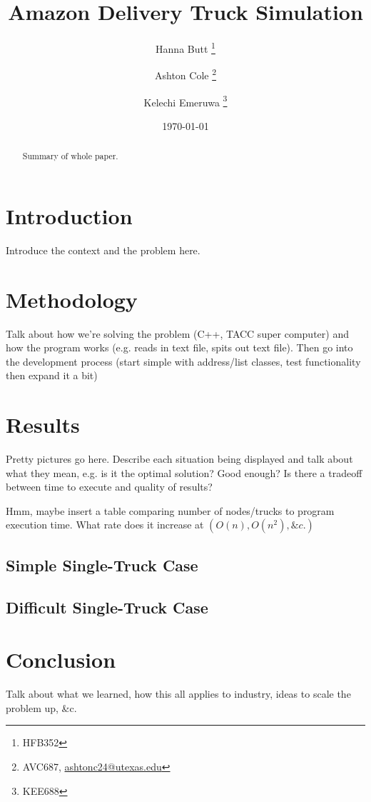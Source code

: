 \documentclass[letterpaper]{article}
\title{Amazon Delivery Truck Simulation}
\author{Hanna Butt \thanks{HFB352} \and Ashton Cole \thanks{AVC687, \href{mailto:ashtonc24@utexas.edu}{ashtonc24@utexas.edu}} \and Kelechi Emeruwa \thanks{KEE688}}
\date{\today}
\begin{document}
    \maketitle

    \begin{abstract}
        Summary of whole paper.
    \end{abstract}

    \section{Introduction}
    Introduce the context and the problem here.

    \section{Methodology}
    Talk about how we're solving the problem (C++, TACC super computer) and how the program works (e.g. reads in text file, spits out text file). Then go into the development process (start simple with address/list classes, test functionality then expand it a bit)

    \section{Results}
    Pretty pictures go here. Describe each situation being displayed and talk about what they mean, e.g. is it the optimal solution? Good enough? Is there a tradeoff between time to execute and quality of results?

    Hmm, maybe insert a table comparing number of nodes/trucks to program execution time. What rate does it increase at $(O(n), O(n^2), \&c.)$

    \subsection{Simple Single-Truck Case}


    \subsection{Difficult Single-Truck Case}

    \section{Conclusion}
    Talk about what we learned, how this all applies to industry, ideas to scale the problem up, \&c.
\end{document}
